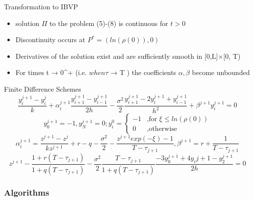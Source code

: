 \documentclass{beamer}
\begin{document}
\begin{frame}{Transformation to IBVP}
    \begin{itemize}
        \item solution $\Pi$ to the problem (5)-(8) is continuous for $t > 0$
        \item Discontinuity occurs at $P^{*} = (ln(\rho(0)), 0)$
        \item Derivatives of the solution exist and are sufficiently smooth in [0,L]×[0, T)
        \item For times t → 0^{+} (i.e. $when \tau$ → T ) the coefficients $\alpha, \beta$ become unbounded
    \end{itemize}
\end{frame}
\begin{frame}{Finite Difference Schemes}
\begin{equation}
    \frac{y_{i}^{j+1} - y_{i}^{j}}{k} + \alpha_{i}^{j+1}\frac{y_{i+1}^{j+1} - y_{i-1}^{j+1}}{2h} - \frac{\sigma^{2}}{2}\frac{y_{i+1}^{j+1} - 2y_{i}^{j+1} + y_{i-1}^{j+1}}{h^{2}} + \beta^{j+1}y_{i}^{j+1} = 0
\end{equation}
\begin{equation}
    y_{0}^{j+1} = -1, y_{N}^{j+1} = 0; y_{i}^{0} = \begin{cases}
    -1 &\text{,for $\xi \leq ln(\rho(0))$}\\
    0 &\text{,otherwise}
    \end{cases}
\end{equation}
\begin{equation}
    \alpha_{i}^{j+1} = \frac{z^{j+1} - z^{j}}{kz^{j+1}} + r - q - \frac{\sigma^{2}}{2} - \frac{z^{j+1}exp(-\xi) - 1}{T - \tau_{j+1}}, \beta^{j+1} = r + \frac{1}{T - \tau_{j+1}}
\end{equation}
\begin{equation}
    z^{j+1} - \frac{1 + r(T-\tau_{j+1})}{1 + q(T-\tau_{j+1})} - \frac{\sigma^{2}}{2}\frac{T - \tau_{j+1}}{1 + q(T-\tau_{j+1})}\frac{-3y_{0}^{j+1} + 4y_{i}{j+1} - y_{2}^{j+1}}{2h} = 0
\end{equation}
\end{frame}





\begin{frame}
\frametitle{Algorithms}
\tableofcontents
\end{frame}
\end{document}
